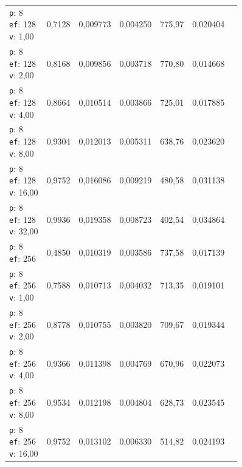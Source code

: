 \begin{table}[htbp]
\begin{tabularx}{\textwidth}{Xrrrrrr}
    \makecell{\texttt{p}: 8\\\texttt{ef}: 128\\\texttt{v}: 1,00} & 0,7128 & 0,009773 & 0,004250 & 775,97 & 0,020404 \\
    \makecell{\texttt{p}: 8\\\texttt{ef}: 128\\\texttt{v}: 2,00} & 0,8168 & 0,009856 & 0,003718 & 770,80 & 0,014668 \\
    \makecell{\texttt{p}: 8\\\texttt{ef}: 128\\\texttt{v}: 4,00} & 0,8664 & 0,010514 & 0,003866 & 725,01 & 0,017885 \\
    \makecell{\texttt{p}: 8\\\texttt{ef}: 128\\\texttt{v}: 8,00} & 0,9304 & 0,012013 & 0,005311 & 638,76 & 0,023620 \\
    \makecell{\texttt{p}: 8\\\texttt{ef}: 128\\\texttt{v}: 16,00} & 0,9752 & 0,016086 & 0,009219 & 480,58 & 0,031138 \\
    \makecell{\texttt{p}: 8\\\texttt{ef}: 128\\\texttt{v}: 32,00} & 0,9936 & 0,019358 & 0,008723 & 402,54 & 0,034864 \\
    \makecell{\texttt{p}: 8\\\texttt{ef}: 256} & 0,4850 & 0,010319 & 0,003586 & 737,58 & 0,017139 \\
    \makecell{\texttt{p}: 8\\\texttt{ef}: 256\\\texttt{v}: 1,00} & 0,7588 & 0,010713 & 0,004032 & 713,35 & 0,019101 \\
    \makecell{\texttt{p}: 8\\\texttt{ef}: 256\\\texttt{v}: 2,00} & 0,8778 & 0,010755 & 0,003820 & 709,67 & 0,019344 \\
    \makecell{\texttt{p}: 8\\\texttt{ef}: 256\\\texttt{v}: 4,00} & 0,9366 & 0,011398 & 0,004769 & 670,96 & 0,022073 \\
    \makecell{\texttt{p}: 8\\\texttt{ef}: 256\\\texttt{v}: 8,00} & 0,9534 & 0,012198 & 0,004804 & 628,73 & 0,023545 \\
    \makecell{\texttt{p}: 8\\\texttt{ef}: 256\\\texttt{v}: 16,00} & 0,9752 & 0,013102 & 0,006330 & 514,82 & 0,024193 \\

\end{tabularx}
\end{table}
